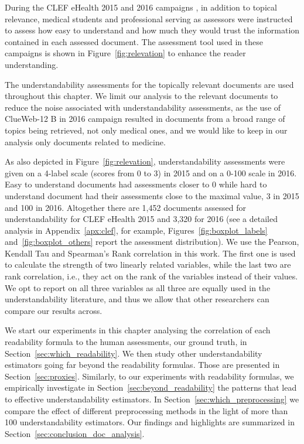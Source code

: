 \documentclass[runningheads,a4paper]{llncs}
\begin{document}
During the CLEF eHealth 2015 and 2016 campaigns \cite{clef15,clef16}, in addition to topical relevance, medical students and professional serving as assessors were instructed to assess how easy to understand and how much they would trust the information contained in each assessed document. The assessment tool used in these campaigns is shown in Figure~\ref{fig:relevation} to enhance the reader understanding.

The understandability assessments for the topically relevant documents are used throughout this chapter.
We limit our analysis to the relevant documents to reduce the noise associated with understandability assessments, as the use of ClueWeb-12 B in 2016 campaign resulted in documents from a broad range of topics being retrieved, not only medical ones, and we would like to keep in our analysis only documents related to medicine.

As also depicted in Figure~\ref{fig:relevation}, understandability assessments were given on a 4-label scale (scores from 0 to 3) in 2015 and on a 0-100 scale in 2016.
Easy to understand documents had assessments closer to 0 while hard to understand document had their assessments close to the maximal value, 3 in 2015 and 100 in 2016.
Altogether there are 1,452 documents assessed for understandability for CLEF eHealth 2015 and 3,320 for 2016 (see a detailed analysis in Appendix~\ref{apx:clef}, for example, Figures~\ref{fig:boxplot_labels} and~\ref{fig:boxplot_others} report the assessment distribution).
We use the Pearson, Kendall Tau and Spearman's Rank correlation in this work. 
The first one is used to calculate the strength of two linearly related variables, while the last two are rank correlation, i.e., they act on the rank of the variables instead of their values.
We opt to report on all three variables as all three are equally used in the understandability literature, and thus we allow that other researchers can compare our results across.

We start our experiments in this chapter analysing the correlation of each readability formula to the human assessments, our ground truth, in Section~\ref{sec:which_readability}.
We then study other understandability estimators going far beyond the readability formulas. Those are presented in Section~\ref{sec:proxies}.
Similarly, to our experiments with readability formulas, we empirically investigate in Section~\ref{sec:beyond_readability} the patterns that lead to effective understandability estimators.
In Section~\ref{sec:which_preprocessing} we compare the effect of different preprocessing methods in the light of more than 100 understandability estimators.
Our findings and highlights are summarized in Section~\ref{sec:conclusion_doc_analysis}.
\end{document}
